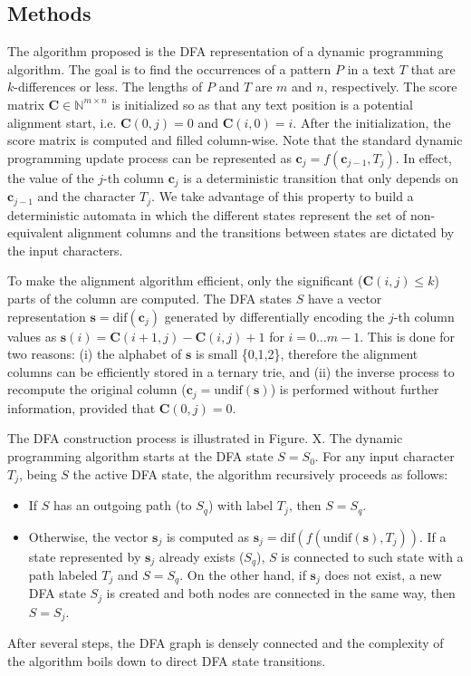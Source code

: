 \documentclass{bioinfo}
\begin{document}
\begin{methods}
\section{Methods}

The algorithm proposed is the DFA representation of a dynamic
programming algorithm. The goal is to find the occurrences of a
pattern $P$ in a text $T$ that are $k$-differences or less. The
lengths of $P$ and $T$ are $m$ and $n$, respectively. The score matrix
$\mathbf{C} \in \mathbb{N}^{m\times n}$ is initialized so as that any
text position is a potential alignment start, i.e. $\mathbf{C}(0,j)=0$
and $\mathbf{C}(i,0) = i$. After the initialization, the score matrix
is computed and filled column-wise. Note that the standard dynamic
programming update process can be represented as
$\mathbf{c}_j=f(\mathbf{c}_{j-1},T_j)$. In effect, the value of the 
$j$-th column $\mathbf{c}_{j}$ is a deterministic transition that only
depends on $\mathbf{c}_{j-1}$ and the character $T_j$. We take
advantage of this property to build a deterministic automata in which
the different states represent the set of non-equivalent alignment
columns and the transitions between states are dictated by the input
characters.

To make the alignment algorithm efficient, only the significant
($\mathbf{C}(i,j) \le k$) parts of the column are computed. The DFA
states $S$ have a vector representation
$\mathbf{s} = \mbox{dif}(\mathbf{c}_j)$ generated by differentially
encoding the $j$-th column values as 
$\mathbf{s}(i)=\mathbf{C}(i+1,j)-\mathbf{C}(i,j)+1$ for
$i=0\ldots m-1$. This is done for two reasons: (i) the alphabet of
$\mathbf{s}$ is small \{0,1,2\}, therefore the alignment columns can be
efficiently stored in a ternary trie, and (ii) the inverse process to
recompute the original column ($\mathbf{c}_j=\mbox{undif}(\mathbf{s})$)
is performed without further information, provided that $\mathbf{C}(0,j)=0$. 

\begin{figure}[!tpb]
\caption{}\label{matrix}
\end{figure}

The DFA construction process is illustrated in Figure. X. The
dynamic programming algorithm starts at the DFA state
$S = S_0$. For any input character $T_j$, being $S$
the active DFA state, the algorithm recursively proceeds as follows:
\begin{itemize}
\item If $S$ has an outgoing path (to $S_q$) with
label $T_j$, then $S = S_q$.
\item Otherwise, the vector $\mathbf{s}_j$ is computed as
$\mathbf{s}_j=\mbox{dif}(f(\mbox{undif}(\mathbf{s}), T_j))$.
If a state represented by $\mathbf{s}_j$ already exists ($S_q$), $S$
is connected to such state with a path labeled $T_j$ and $S = S_q$. On
the other hand, if $\mathbf{s}_j$ does not exist, a new DFA state
$S_j$ is created and both nodes are connected in the same
way, then $S = S_j$.
\end{itemize}
After several steps, the DFA graph is densely connected and the
complexity of the algorithm boils down to direct DFA state
transitions.


\end{methods}
\end{document}
